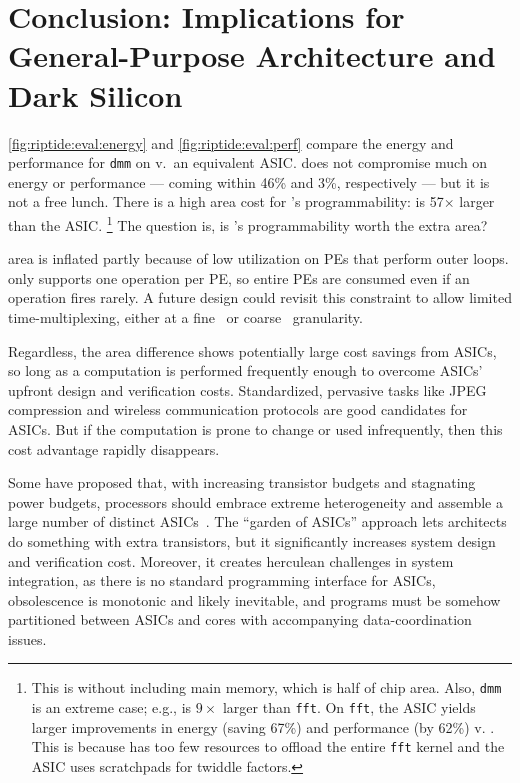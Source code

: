 \section{Conclusion: Implications for General-Purpose Architecture and Dark Silicon}
\label{sec:implications}

\autoref{fig:riptide:eval:energy} and \autoref{fig:riptide:eval:perf} compare the energy and performance for {\tt dmm} on \riptide v.\ an equivalent ASIC.
%
\riptide does not compromise much on energy or performance --- coming within 46\% and 3\%, respectively --- but it is not a free lunch.
%
There is a high area cost for \riptide's programmability: \riptide is 57$\times$ larger than the ASIC.%
\footnote{This is without including main memory, which is half of chip area. Also, {\tt dmm} is an extreme case; e.g., \riptide is $9\times$ larger than {\tt fft}. On {\tt fft}, the ASIC yields larger improvements in energy (saving 67\%) and performance (by 62\%) v. \riptide. This is because \riptide has too few resources to offload the entire {\tt fft} kernel and the ASIC uses scratchpads for twiddle factors.}
%
The question is, is \riptide's programmability worth the extra area?

\riptide area is inflated partly because of low utilization on PEs that perform outer loops.
%
\riptide only supports one operation per PE, so entire PEs are consumed even if an operation fires rarely.
%
A future design could revisit this constraint to allow limited time-multiplexing,
either at a fine~\cite{weng2020hybrid} or coarse~\cite{nguyen2021fifer} granularity.

Regardless, the area difference shows potentially large cost savings from ASICs,
so long as a computation is performed frequently enough to overcome
ASICs' upfront design and verification costs.
%
Standardized, pervasive tasks like JPEG compression and wireless communication protocols are good candidates for ASICs.
%
But if the computation is prone to change
or used infrequently, then this cost advantage rapidly disappears.

Some have proposed that, with increasing transistor budgets and
stagnating power budgets, processors should embrace extreme
heterogeneity and assemble a large number of distinct
ASICs~\cite{venkatesh2010conservation,taylor2012dark}.
%
The ``garden of ASICs'' approach lets architects do something
with extra transistors, but it significantly increases
system design and verification cost.
%
Moreover, it creates herculean
challenges in system integration,
%
as there is no standard programming interface for ASICs,
obsolescence is monotonic and likely inevitable,
and programs must be somehow partitioned between ASICs
and cores with accompanying data-coordination issues.

